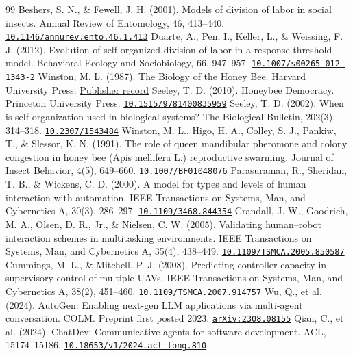 \documentclass[11pt]{article}
\begin{document}
\begin{thebibliography}{99}
 Beshers, S. N., \& Fewell, J. H. (2001). Models of division of labor in social insects. Annual Review of Entomology, 46, 413--440. \href{https://doi.org/10.1146/annurev.ento.46.1.413}{\nolinkurl{10.1146/annurev.ento.46.1.413}}
 Duarte, A., Pen, I., Keller, L., \& Weissing, F. J. (2012). Evolution of self-organized division of labor in a response threshold model. Behavioral Ecology and Sociobiology, 66, 947--957. \href{https://doi.org/10.1007/s00265-012-1343-2}{\nolinkurl{10.1007/s00265-012-1343-2}}
 Winston, M. L. (1987). The Biology of the Honey Bee. Harvard University Press. \href{https://www.hup.harvard.edu/books/9780674074095}{Publisher record}
 Seeley, T. D. (2010). Honeybee Democracy. Princeton University Press. \href{https://doi.org/10.1515/9781400835959}{\nolinkurl{10.1515/9781400835959}}
 Seeley, T. D. (2002). When is self-organization used in biological systems? The Biological Bulletin, 202(3), 314--318. \href{https://doi.org/10.2307/1543484}{\nolinkurl{10.2307/1543484}}
 Winston, M. L., Higo, H. A., Colley, S. J., Pankiw, T., \& Slessor, K. N. (1991). The role of queen mandibular pheromone and colony congestion in honey bee (Apis mellifera L.) reproductive swarming. Journal of Insect Behavior, 4(5), 649--660. \href{https://doi.org/10.1007/BF01048076}{\nolinkurl{10.1007/BF01048076}}
 Parasuraman, R., Sheridan, T. B., \& Wickens, C. D. (2000). A model for types and levels of human interaction with automation. IEEE Transactions on Systems, Man, and Cybernetics A, 30(3), 286--297. \href{https://doi.org/10.1109/3468.844354}{\nolinkurl{10.1109/3468.844354}}
 Crandall, J. W., Goodrich, M. A., Olsen, D. R., Jr., \& Nielsen, C. W. (2005). Validating human--robot interaction schemes in multitasking environments. IEEE Transactions on Systems, Man, and Cybernetics A, 35(4), 438--449. \href{https://doi.org/10.1109/TSMCA.2005.850587}{\nolinkurl{10.1109/TSMCA.2005.850587}}
 Cummings, M. L., \& Mitchell, P. J. (2008). Predicting controller capacity in supervisory control of multiple UAVs. IEEE Transactions on Systems, Man, and Cybernetics A, 38(2), 451--460. \href{https://doi.org/10.1109/TSMCA.2007.914757}{\nolinkurl{10.1109/TSMCA.2007.914757}}
 Wu, Q., et al. (2024). AutoGen: Enabling next-gen LLM applications via multi-agent conversation. COLM. Preprint first posted 2023. \href{https://arxiv.org/abs/2308.08155}{\nolinkurl{arXiv:2308.08155}}
 Qian, C., et al. (2024). ChatDev: Communicative agents for software development. ACL, 15174--15186. \href{https://doi.org/10.18653/v1/2024.acl-long.810}{\nolinkurl{10.18653/v1/2024.acl-long.810}}

\end{thebibliography}
\end{document}
